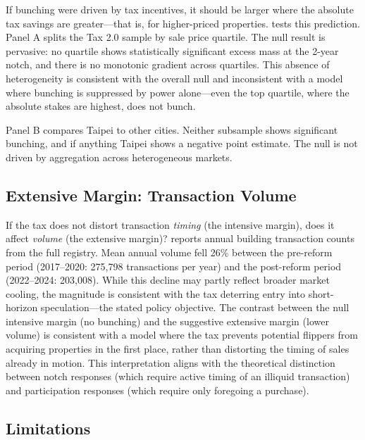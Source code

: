 \documentclass[12pt]{article}
\begin{document}
If bunching were driven by tax incentives, it should be larger where the absolute tax savings are greater---that is, for higher-priced properties.  tests this prediction. Panel A splits the Tax 2.0 sample by sale price quartile. The null result is pervasive: no quartile shows statistically significant excess mass at the 2-year notch, and there is no monotonic gradient across quartiles. This absence of heterogeneity is consistent with the overall null and inconsistent with a model where bunching is suppressed by power alone---even the top quartile, where the absolute stakes are highest, does not bunch.

Panel B compares Taipei to other cities. Neither subsample shows significant bunching, and if anything Taipei shows a negative point estimate. The null is not driven by aggregation across heterogeneous markets.



\subsection{Extensive Margin: Transaction Volume}

If the tax does not distort transaction \textit{timing} (the intensive margin), does it affect \textit{volume} (the extensive margin)?  reports annual building transaction counts from the full registry. Mean annual volume fell 26\% between the pre-reform period (2017--2020: 275,798 transactions per year) and the post-reform period (2022--2024: 203,008). While this decline may partly reflect broader market cooling, the magnitude is consistent with the tax deterring entry into short-horizon speculation---the stated policy objective. The contrast between the null intensive margin (no bunching) and the suggestive extensive margin (lower volume) is consistent with a model where the tax prevents potential flippers from acquiring properties in the first place, rather than distorting the timing of sales already in motion. This interpretation aligns with the theoretical distinction between notch responses (which require active timing of an illiquid transaction) and participation responses (which require only foregoing a purchase).



\subsection{Limitations}
\end{document}
